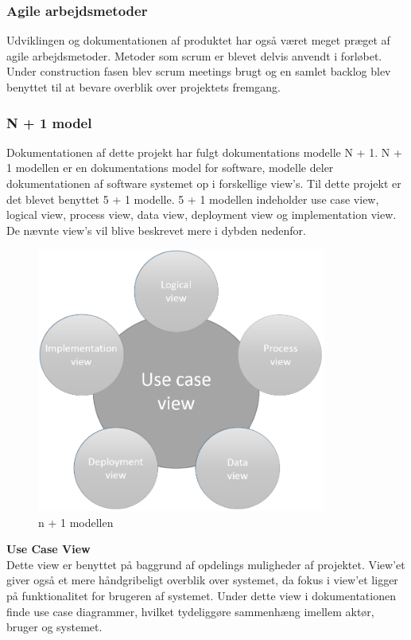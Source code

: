 \subsubsection{Agile arbejdsmetoder}
Udviklingen og dokumentationen af produktet har også været meget præget af agile arbejdsmetoder. Metoder som scrum er blevet delvis anvendt i forløbet. Under construction fasen blev scrum meetings brugt og en samlet backlog blev benyttet til at bevare overblik over projektets fremgang.

\newpage

\subsubsection{N + 1 model}
Dokumentationen af dette projekt har fulgt dokumentations modelle N + 1. N + 1 modellen er en dokumentations model for software, modelle deler dokumentationen af software systemet op i forskellige view's. Til dette projekt er det blevet benyttet 5 + 1 modelle. 5 + 1 modellen indeholder use case view, logical view, process view, data view, deployment view og implementation view. De nævnte view's vil blive beskrevet mere i dybden nedenfor. 

\begin{figure}[H]
	\centering
	\includegraphics[width=0.85\textwidth]{Billeder/Udviklingsproces/n+1}
	\caption{n + 1 modellen}
	\label{fig:n+1}
\end{figure}

\textbf{Use Case View}\\
Dette view er benyttet på baggrund af opdelings muligheder af projektet. View'et giver også et mere håndgribeligt overblik over systemet, da fokus i view'et ligger på funktionalitet for brugeren af systemet. Under dette view i dokumentationen finde use case diagrammer, hvilket tydeliggøre sammenhæng imellem aktør, bruger og systemet.

